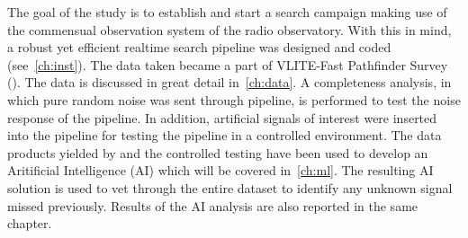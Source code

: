 \par The goal of the study is to establish and start a search campaign making use of the commensual observation system \vlite of the \vla radio observatory.
With this in mind, a robust yet efficient realtime search pipeline was designed and coded (see~\autoref{ch:inst}).
The data taken became a part of VLITE-Fast Pathfinder Survey (\vfpfs). The data is discussed in great detail in~\autoref{ch:data}.
A completeness analysis, in which pure random noise was sent through pipeline, is performed to test the noise response of the pipeline. In addition, artificial signals of interest were inserted into the pipeline for testing the pipeline in a controlled environment. 
The data products yielded by \vfpfs and the controlled testing have been used to develop an Aritificial Intelligence (AI) which will be covered in~\autoref{ch:ml}.
The resulting AI solution is used to vet through the entire \vfpfs dataset to identify any unknown signal missed previously. Results of the AI analysis are also reported in the same chapter. 


